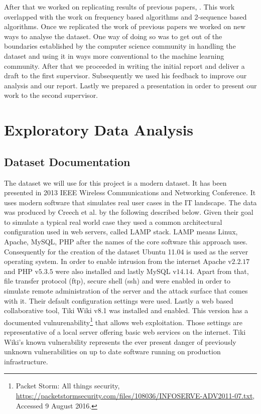 \documentclass[reqno,openany,12pt]{amsbook}
\begin{document}
After that we worked on replicating results of previous papers\cite{adf1}, \cite{adf2}. This work overlapped with the work on frequency based algorithms and 2-sequence based algorithms. Once we replicated the work of previous papers we worked on new ways to analyse the dataset. One way of doing so was to get out of the boundaries established by the computer science community in handling the dataset and using it in ways more conventional to the machine learning community. After that we proceeded in writing the initial report and deliver a draft to the first supervisor. Subsequently we used his feedback to improve our analysis and our report. Lastly we prepared a presentation in order to present our work to the second supervisor.


\chapter{Exploratory Data Analysis}

\section{Dataset Documentation}

The dataset we will use for this project is a modern dataset. It has been presented in 2013 IEEE Wireless Communications and Networking Conference\cite{dat2}. It uses modern software that simulates real user cases in the IT landscape. The data was produced by Creech et al.\cite{dat2} by the following described below. Given their goal to simulate a typical real world case they used a common architectural configuration used in web servers, called LAMP stack. LAMP means Linux, Apache, MySQL, PHP after the names of the core software this approach uses. Consequently for the creation of the dataset Ubuntu 11.04 is used as the server operating system. In order to enable intrusion from the internet Apache v$2.2.17$ and PHP v$5.3.5$ were also installed and lastly MySQL v$14.14$. Apart from that, file transfer protocol (ftp), secure shell (ssh) and  were enabled in order to simulate remote administration of the server and the attack surface that comes with it. Their default configuration settings were used. Lastly a web based collaborative tool, Tiki Wiki v8.1 was installed and enabled. This version has a documented vulnurenability\footnote{Packet Storm: All things security, \url{https://packetstormsecurity.com/files/108036/INFOSERVE-ADV2011-07.txt}, Accessed 9 August 2016.} that allows web exploitation. Those settings are representative of a local server offering basic web services on the internet. Tiki Wiki's known vulnerability represents the ever present danger of previously unknown vulnerabilities on up to date software running on production infrastructure.
\end{document}
